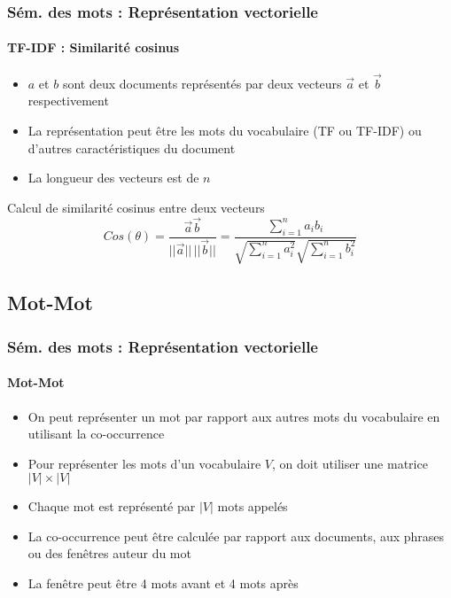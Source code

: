 \documentclass[xcolor=table]{beamer}
\begin{document}
\begin{frame}
\frametitle{Sém. des mots : Représentation vectorielle}
\framesubtitle{TF-IDF : Similarité cosinus}

\begin{minipage}{.68\textwidth}
\begin{itemize}
	\item $a$ et $b$ sont deux documents représentés par deux vecteurs $\overrightarrow{a}$ et $\overrightarrow{b}$ respectivement
	\item La représentation peut être les mots du vocabulaire (TF ou TF-IDF) ou d'autres caractéristiques du document
	\item La longueur des vecteurs est de $n$
\end{itemize}
\end{minipage}
\begin{minipage}{.3\textwidth}
\end{minipage}

\begin{block}{Calcul de similarité cosinus entre deux vecteurs}
	\[
	Cos(\theta) = \frac{\overrightarrow{a} \overrightarrow{b}}{||\overrightarrow{a}||\, ||\overrightarrow{b}||}
	= \frac{\sum_{i=1}^{n} a_i b_i}{\sqrt{\sum_{i=1}^{n} a_i^2} \sqrt{\sum_{i=1}^{n} b_i^2}}
	\]
\end{block}

\end{frame}

\subsection{Mot-Mot}

\begin{frame}
\frametitle{Sém. des mots : Représentation vectorielle}
\framesubtitle{Mot-Mot}

\begin{itemize}
	\item On peut représenter un mot par rapport aux autres mots du vocabulaire en utilisant la co-occurrence
	\item Pour représenter les mots d'un vocabulaire $ V $, on doit utiliser une matrice $|V| \times |V|$
	\item Chaque mot est représenté par $|V|$ mots appelés 
	\item La co-occurrence peut être calculée par rapport aux documents, aux phrases ou des fenêtres auteur du mot
	\item La fenêtre peut être 4 mots avant et 4 mots après
\end{itemize}

\end{frame}
\end{document}
